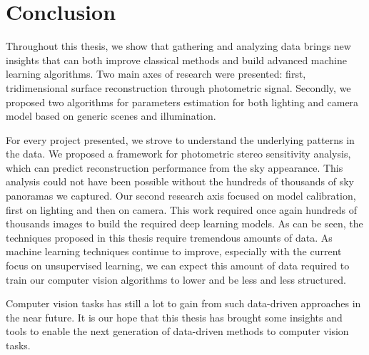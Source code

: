 \chapter*{Conclusion}         %


Throughout this thesis, we show that gathering and analyzing data brings new insights that can both improve classical methods and build advanced machine learning algorithms. Two main axes of research were presented: first, tridimensional surface reconstruction through photometric signal. Secondly, we proposed two algorithms for parameters estimation for both lighting and camera model based on generic scenes and illumination. 

For every project presented, we strove to understand the underlying patterns in the data. We proposed a framework for photometric stereo sensitivity analysis, which can predict reconstruction performance from the sky appearance. This analysis could not have been possible without the hundreds of thousands of sky panoramas we captured. Our second research axis focused on model calibration, first on lighting and then on camera. This work required once again hundreds of thousands images to build the required deep learning models. As can be seen, the techniques proposed in this thesis require tremendous amounts of data. As machine learning techniques continue to improve, especially with the current focus on unsupervised learning, we can expect this amount of data required to train our computer vision algorithms to lower and be less and less structured. 

Computer vision tasks has still a lot to gain from such data-driven approaches in the near future. It is our hope that this thesis has brought some insights and tools to enable the next generation of data-driven methods to computer vision tasks.

